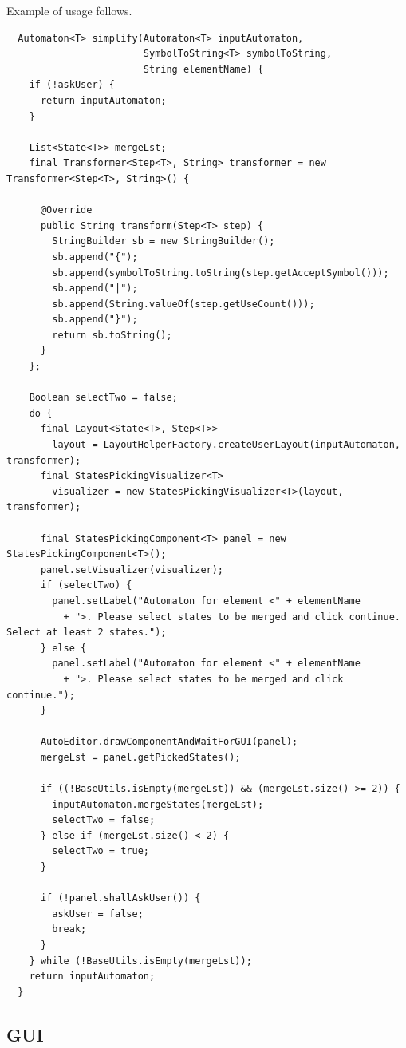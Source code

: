 \documentclass[a4paper,10pt,oneside]{article}
\begin{document}
Example of usage follows.
\begin{verbatim}
  Automaton<T> simplify(Automaton<T> inputAutomaton,
                        SymbolToString<T> symbolToString,
                        String elementName) {
    if (!askUser) {
      return inputAutomaton;
    }

    List<State<T>> mergeLst;
    final Transformer<Step<T>, String> transformer = new Transformer<Step<T>, String>() {

      @Override
      public String transform(Step<T> step) {
        StringBuilder sb = new StringBuilder();
        sb.append("{");
        sb.append(symbolToString.toString(step.getAcceptSymbol()));
        sb.append("|");
        sb.append(String.valueOf(step.getUseCount()));
        sb.append("}");
        return sb.toString();
      }
    };

    Boolean selectTwo = false;
    do {
      final Layout<State<T>, Step<T>>
        layout = LayoutHelperFactory.createUserLayout(inputAutomaton, transformer);
      final StatesPickingVisualizer<T>
        visualizer = new StatesPickingVisualizer<T>(layout, transformer);

      final StatesPickingComponent<T> panel = new StatesPickingComponent<T>();
      panel.setVisualizer(visualizer);
      if (selectTwo) {
        panel.setLabel("Automaton for element <" + elementName
          + ">. Please select states to be merged and click continue. Select at least 2 states.");
      } else {
        panel.setLabel("Automaton for element <" + elementName
          + ">. Please select states to be merged and click continue.");
      }
      
      AutoEditor.drawComponentAndWaitForGUI(panel);
      mergeLst = panel.getPickedStates();

      if ((!BaseUtils.isEmpty(mergeLst)) && (mergeLst.size() >= 2)) {
        inputAutomaton.mergeStates(mergeLst);
        selectTwo = false;
      } else if (mergeLst.size() < 2) {
        selectTwo = true;
      }

      if (!panel.shallAskUser()) {
        askUser = false;
        break;
      }
    } while (!BaseUtils.isEmpty(mergeLst));
    return inputAutomaton;
  }
\end{verbatim}

\subsection{GUI} \label{subsection:GUI}
\end{document}
